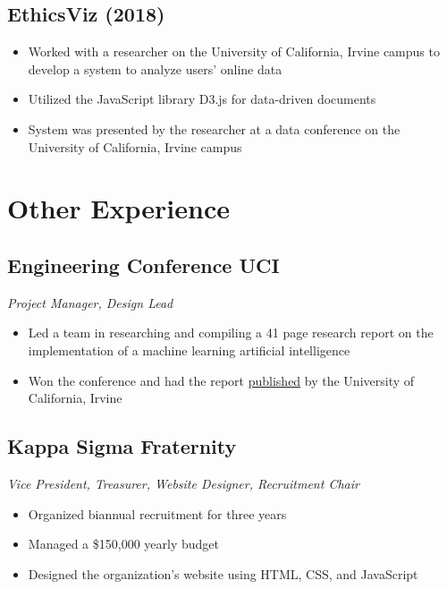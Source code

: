 \documentclass[10pt]{article}
\begin{document}
\subsection{EthicsViz (2018)}

\begin{itemize}
	\setlength\itemsep{0em}
	\item Worked with a researcher on the University of California, Irvine campus to develop a system to analyze users' online data
	\item Utilized the JavaScript library D3.js for data-driven documents
	\item System was presented by the researcher at a data conference on the University of California, Irvine campus
\end{itemize}

\section{Other Experience}

\subsection{Engineering Conference UCI}

\noindent\textit{Project Manager, Design Lead}

\begin{itemize}
	\setlength\itemsep{0em}
	\item Led a team in researching and compiling a 41 page research report on the implementation of a machine learning artificial intelligence
	\item Won the conference and had the report \href{https://escholarship.org/uc/item/3hm5q8b8}{published} by the University of California, Irvine
\end{itemize}

\subsection{Kappa Sigma Fraternity}

\noindent\textit{Vice President, Treasurer, Website Designer, Recruitment Chair}

\begin{itemize}
	\setlength\itemsep{0em}
	\item Organized biannual recruitment for three years
	\item Managed a \$150,000 yearly budget
	\item Designed the organization's website using HTML, CSS, and JavaScript
\end{itemize}
\end{document}
